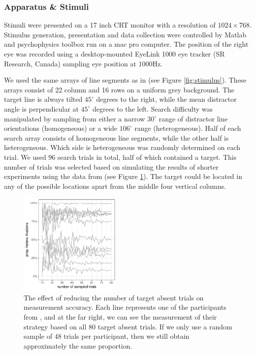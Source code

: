 \documentclass[]{rsos}
\begin{document}
\subsubsection{Apparatus \& Stimuli}

Stimuli were presented on a 17 inch CRT monitor with a resolution of $1024 \times 768$. Stimulus generation, presentation and data collection were controlled by Matlab and psychophysics toolbox \cite{brainard1997,cornelissen2002} run on a mac pro computer. The position of the right eye was recorded using a desktop-mounted EyeLink 1000 eye tracker (SR Research, Canada) sampling eye position at 1000Hz. 

We used the same arrays of line segments as in \cite{nowakowska2017} (see Figure \ref{fig:stimulus}). These arrays consist of 22 column and 16 rows on a uniform grey background. The target line is always tilted $45^{\circ}$ degrees to the right, while the mean distractor angle is perpendicular at $45^{\circ}$ degrees to the left. Search difficulty was manipulated by sampling from either a narrow $30^{\circ}$ range of distractor line orientations (homogeneous) or a wide $106^{\circ}$ range (heterogeneous). Half of each search array consists of homogeneous line segments, while the other half is heterogeneous. Which side is heterogeneous was randomly determined on each trial. We used 96 search trials in total, half of which contained a target. This number of trials was selected based on simulating the results of shorter experiments using the data from \cite{nowakowska2017} (see Figure \ref{fig:num_trials}). The target could be located in any of the possible locations apart from the middle four vertical columns.

\begin{figure}
\centering
 \includegraphics[width=5cm]{Figures/using_smaller_sample_sizes.pdf}
\caption{The effect of reducing the number of target absent trials on measurement accuracy. Each line represents one of the participants from \cite{nowakowska2017}, and at the far right, we can see the measurement of their strategy based on all 80 target absent trials. If we only use a random sample of 48 trials per participant, then we still obtain approximately the same proportion.}
\label{fig:num_trials}
\end{figure}
\end{document}
